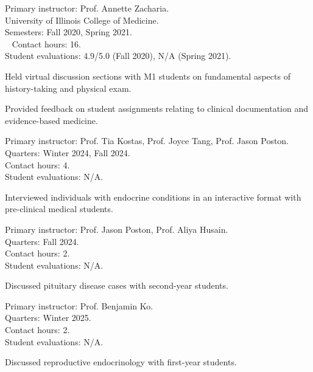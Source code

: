 \documentclass{komacv}
\begin{document}
{Primary instructor: Prof. Annette Zacharia.\\
University of Illinois College of Medicine.\\
Semesters: Fall 2020, Spring 2021.\\~
Contact hours: 16.\\
Student evaluations: 4.9/5.0 (Fall 2020), N/A (Spring 2021).
\begin{compactitem}
\item Held virtual discussion sections with M1 students on fundamental aspects of history-taking and physical exam.
\item Provided feedback on student assignments relating to clinical documentation and evidence-based medicine.
\end{compactitem}}

{Primary instructor: Prof. Tia Kostas, Prof. Joyce Tang, Prof. Jason Poston.\\
Quarters: Winter 2024, Fall 2024.\\
Contact hours: 4.\\
Student evaluations: N/A.
\begin{compactitem}
\item Interviewed individuals with endocrine conditions in an interactive format with pre-clinical medical students.
\end{compactitem}}

{Primary instructor: Prof. Jason Poston, Prof. Aliya Husain.\\
Quarters: Fall 2024.\\
Contact hours: 2.\\
Student evaluations: N/A.
\begin{compactitem}
\item Discussed pituitary disease cases with second-year students.
\end{compactitem}}

{Primary instructor: Prof. Benjamin Ko.\\
Quarters: Winter 2025.\\
Contact hours: 2.\\
Student evaluations: N/A.
\begin{compactitem}
\item Discussed reproductive endocrinology with first-year students.
\end{compactitem}}
\end{document}
